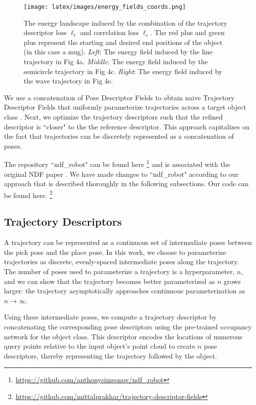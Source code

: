\documentclass[10pt,twocolumn,letterpaper]{article}
\begin{document}
\begin{figure*}[h]
    \centering
    \texttt{[image: latex/images/energy\_fields\_coords.png]}
    \caption{The energy landscape induced by the combination of the trajectory descriptor loss $\ell_t$ and correlation loss $\ell_c$. The red plus and green plus represent the starting and desired end positions of the object (in this case a mug). \textit{Left}: The energy field induced by the line trajectory in Fig 4a.  \textit{Middle}: The energy field induced by the semicircle trajectory in Fig 4c. \textit{Right}: The energy field induced by the wave trajectory in Fig 4e.}
    \label{fig:energy-fields}
\end{figure*}

We use a concatenation of Pose Descriptor Fields to
obtain naive Trajectory Descriptor Fields that uniformly parameterize trajectories across a target object class \cite{simeonovdu2021ndf}. Next, we optimize the trajectory descriptors such that the refined descriptor is ``closer" to the the reference descriptor. This approach capitalizes on the fact that trajectories can be discretely represented as a concatenation of poses.

The repository ``ndf\_robot" can be found here \footnote{\href{https://github.com/anthonysimeonov/ndf\_robot}{https://github.com/anthonysimeonov/ndf\_robot}} and is associated with the original NDF paper \cite{simeonovdu2021ndf}.  We have made changes to ``ndf\_robot" according to our approach that is described thoroughly in the following subsections. Our code can be found here. \footnote{\href{https://github.com/mittalprakhar/trajectory-descriptor-fields}{https://github.com/mittalprakhar/trajectory-descriptor-fields}}

\subsection{Trajectory Descriptors}

A trajectory can be represented as a continuous set of intermediate poses between the pick pose and the place pose. In this work, we choose to parameterize trajectories as discrete, evenly-spaced intermediate poses along the trajectory. The number of poses used to parameterize a trajectory is a hyperparameter, $n$, and we can show that the trajectory becomes better parameterized as $n$ grows larger: the trajectory asymptotically approaches continuous parameterization as $n \rightarrow \infty$. 

Using these intermediate poses, we compute a trajectory descriptor by concatenating the corresponding pose descriptors using the pre-trained occupancy network for the object class. This descriptor encodes the locations of numerous query points relative to the input object's point cloud to create $n$ pose descriptors, thereby representing the trajectory followed by the object.
\end{document}
